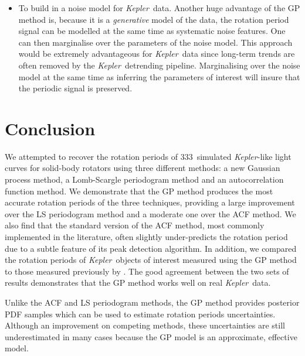 \documentclass[useAMS, usenatbib, preprint, 12pt]{aastex}
\newcommand{\Kepler}{{\it Kepler}}
\newcommand{\kepler}{\Kepler}
\newcommand{\naigrain}{333}
\newcommand{\tdmcomment}[1]{{\color{blue}#1}}
\begin{document}
\begin{itemize}
\item{To build in a noise model for \kepler\ data.
Another huge advantage of the GP method is, because it is a {\it generative}
model of the data, the rotation period signal can be modelled at the same time
as systematic noise features.
One can then marginalise over the parameters of the noise model.
This approach would be extremely advantageous for \kepler\ data since
long-term trends are often removed by the \kepler\ detrending pipeline.
Marginalising over the noise model at the same time as inferring the
parameters of interest will insure that the periodic signal is preserved.}
\end{itemize}

\section{Conclusion}

We attempted to recover the rotation periods of \naigrain\ simulated
\kepler-like light curves for solid-body rotators \citep{Aigrain2015} using
three different methods: a new Gaussian process method, a Lomb-Scargle
periodogram method and an autocorrelation function method.
We demonstrate that the GP method produces the most accurate rotation periods
of the three techniques, providing a large improvement over the LS periodogram
method and a moderate one over the ACF method.
We also find that the standard version of the ACF method, most commonly
implemented in the literature, often slightly under-predicts the rotation
period due to a subtle feature of its peak detection algorithm.
In addition, we compared the rotation periods of \kepler\ objects of
interest measured using the GP method to those measured previously by
\citet{Mcquillan2013}.
The good agreement between the two sets of results demonstrates that the GP
method works well on real \kepler\ data.

Unlike the ACF and LS periodogram methods, the GP method provides posterior
PDF samples which can be used to estimate rotation periods uncertainties.
Although an improvement on competing methods, these uncertainties are still
underestimated in many cases because the GP model is an approximate, effective
model.
\end{document}
